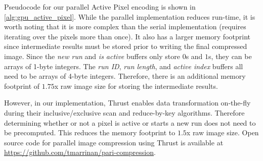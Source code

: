\documentclass{vgtc}                          %
\begin{document}
Pseudocode for our parallel Active Pixel encoding is shown in \autoref{alg:gpu_active_pixel}. While the parallel implementation reduces run-time, it is worth noting that it is more complex than the serial implementation (requires iterating over the pixels more than once). It also has a larger memory footprint since intermediate results must be stored prior to writing the final compressed image. Since the \textit{new run} and \textit{is active} buffers only store $0$s and $1$s, they can be arrays of 1-byte integers. The \textit{run ID}, \textit{run length}, and \textit{active index} buffers all need to be arrays of 4-byte integers. Therefore, there is an additional memory footprint of $1.75$x raw image size for storing the intermediate results.

However, in our implementation, Thrust enables data transformation on-the-fly during their inclusive/exclusive scan and reduce-by-key algorithms. Therefore determining whether or not a pixel is active or starts a new run does not need to be precomputed. This reduces the memory footprint to $1.5$x raw image size. Open source code for parallel image compression using Thrust is available at \url{https://github.com/tmarrinan/pari-compression}.
\end{document}

